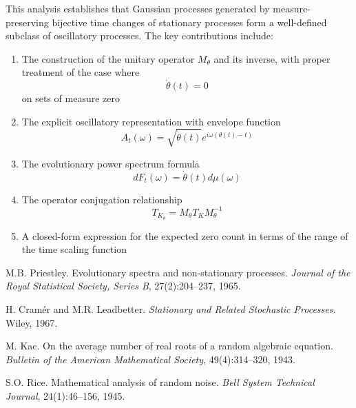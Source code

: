 \documentclass{article}
\newcommand{\tmem}[1]{{\em #1\/}}
\begin{document}
This analysis establishes that Gaussian processes generated by
measure-preserving bijective time changes of stationary processes form a
well-defined subclass of oscillatory processes. The key contributions include:
\begin{enumerate}
  \item The construction of the unitary operator $M_{\theta}$ and its inverse,
  with proper treatment of the case where
  \begin{equation}
    \dot{\theta} (t) = 0
  \end{equation}
  on sets of measure zero
  
  \item The explicit oscillatory representation with envelope function
  \begin{equation}
    A_t (\omega) = \sqrt{\dot{\theta} (t)} e^{i \omega (\theta (t) - t)}
  \end{equation}
  \item The evolutionary power spectrum formula
  \begin{equation}
    dF_t (\omega) = \dot{\theta} (t) d \mu (\omega)
  \end{equation}
  \item The operator conjugation relationship
  \begin{equation}
    T_{K_{\theta}} = M_{\theta} T_K M_{\theta}^{- 1}
  \end{equation}
  \item A closed-form expression for the expected zero count in terms of the
  range of the time scaling function
\end{enumerate}
\begin{thebibliography}{99}
  {}M.B. Priestley. Evolutionary spectra and
  non-stationary processes. {\tmem{Journal of the Royal Statistical Society,
  Series B}}, 27(2):204--237, 1965.
  
  {}H. Cram{\'e}r and M.R. Leadbetter. {\tmem{Stationary
  and Related Stochastic Processes}}. Wiley, 1967.
  
  {}M. Kac. On the average number of real roots of a random
  algebraic equation. {\tmem{Bulletin of the American Mathematical Society}},
  49(4):314--320, 1943.
  
  {}S.O. Rice. Mathematical analysis of random noise.
  {\tmem{Bell System Technical Journal}}, 24(1):46--156, 1945.
\end{thebibliography}
\end{document}
